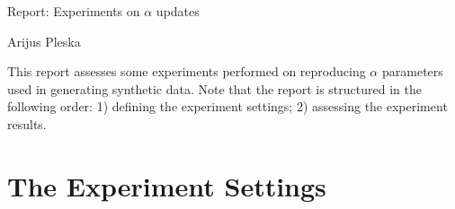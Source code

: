 \documentclass[12pt]{article}
\begin{document}
\begingroup  
  \centering
  \large Report: Experiments on $\alpha$ updates \par
  \large Arijus Pleska \par
\endgroup

\par This report assesses some experiments performed on reproducing $\alpha$ parameters used in generating synthetic data. Note that the report is structured in the following order: 1) defining the experiment settings; 2) assessing the experiment results.

\section*{The Experiment Settings}
\end{document}
